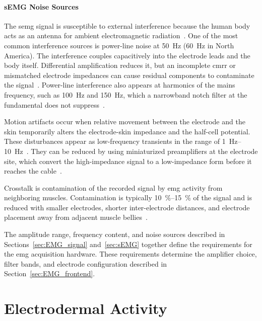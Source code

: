 \paragraph{sEMG Noise Sources} \label{sec:emg_noise}

The \gls{semg} signal is susceptible to external interference because the human body acts as an antenna for ambient electromagnetic radiation~\cite{chowdhury_surface_2013, kamen_essentials_2010}. One of the most common interference sources is power-line noise at \SI{50}{\hertz} (\SI{60}{\hertz} in North America). The interference couples capacitively into the electrode leads and the body itself. Differential amplification reduces it, but an incomplete \gls{cmrr} or mismatched electrode impedances can cause residual components to contaminate the signal~\cite{kamen_essentials_2010}. Power-line interference also appears at harmonics of the mains frequency, such as \SI{100}{\hertz} and \SI{150}{\hertz}, which a narrowband notch filter at the fundamental does not suppress~\cite{chowdhury_surface_2013}.

Motion artifacts occur when relative movement between the electrode and the skin temporarily alters the electrode-skin impedance and the half-cell potential. These disturbances appear as low-frequency transients in the range of \SIrange{1}{10}{\hertz}~\cite{chowdhury_surface_2013}. They can be reduced by using miniaturized preamplifiers at the electrode site, which convert the high-impedance signal to a low-impedance form before it reaches the cable~\cite{konrad_abc_2006}.

Crosstalk is contamination of the recorded signal by \gls{emg} activity from neighboring muscles. Contamination is typically \SIrange{10}{15}{\percent} of the signal and is reduced with smaller electrodes, shorter inter-electrode distances, and electrode placement away from adjacent muscle bellies~\cite{konrad_abc_2006}.

The amplitude range, frequency content, and noise sources described in Sections~\ref {sec:EMG_signal} and~\ref {sec:sEMG} together define the requirements for the \gls{emg} acquisition hardware. These requirements determine the amplifier choice, filter bands, and electrode configuration described in Section~\ref{sec:EMG_frontend}.

\section{Electrodermal Activity} \label{sec:EDA}

